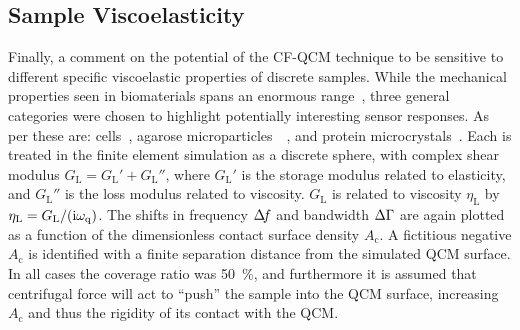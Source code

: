 \subsection{Sample Viscoelasticity}
\label{sec:sampleviscoelasticity}
Finally, a comment on the potential of the CF-QCM technique to be
sensitive to different specific viscoelastic properties of discrete samples.  While
the mechanical properties seen in biomaterials spans an enormous
range~\cite{meyers2008biological}, three general categories were chosen to
highlight potentially interesting sensor responses.  As per
 these are: cells~\cite{li2008thickness}, agarose
microparticles~\cite{li2011surface}~\cite{patra2009viscoelastic}, and
protein microcrystals~\cite{zamiri2009modeling}.  Each is treated in the
finite element simulation as a discrete sphere, with complex shear modulus
$G_\mathrm{L}=G_\mathrm{L}'+G_\mathrm{L}''$, where $G_\mathrm{L}'$ is the
storage modulus related to elasticity, and $G_\mathrm{L}''$ is the loss
modulus related to viscosity.  $G_\mathrm{L}$ is related to viscosity
$\eta_\mathrm{L}$ by $\eta_\mathrm{L}=G_\mathrm{L}/({\mathrm{i}}\omega_\mathrm{q})$.  The
shifts in frequency $\Delta\!f$ and bandwidth $\Delta\Gamma$ are again plotted as a function of
the dimensionless contact surface density $A_\mathrm{c}$.
A fictitious negative $A_\mathrm{c}$
is identified with a finite separation distance from the
simulated QCM surface.  In all cases the coverage ratio was
\SI{50}{\percent}, and furthermore it is assumed that centrifugal force will act to
``push'' the sample into the QCM surface, increasing $A_\mathrm{c}$ and
thus the rigidity of its contact with the QCM\@.
